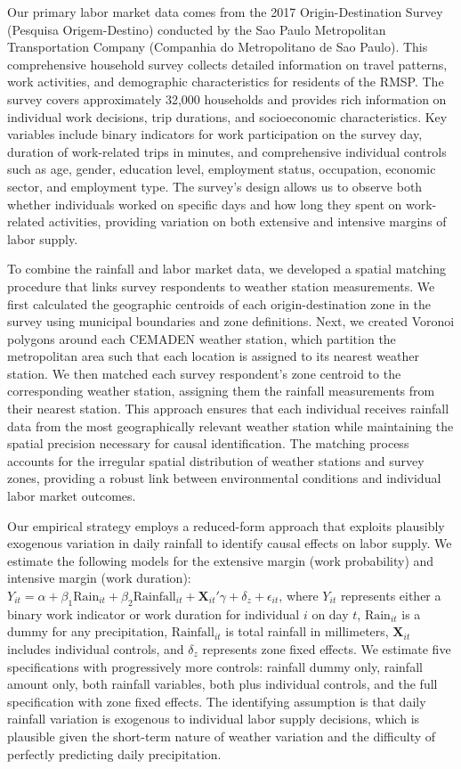 Our primary labor market data comes from the 2017 Origin-Destination Survey (Pesquisa Origem-Destino) conducted by the Sao Paulo Metropolitan Transportation Company (Companhia do Metropolitano de Sao Paulo). This comprehensive household survey collects detailed information on travel patterns, work activities, and demographic characteristics for residents of the RMSP. The survey covers approximately 32,000 households and provides rich information on individual work decisions, trip durations, and socioeconomic characteristics. Key variables include binary indicators for work participation on the survey day, duration of work-related trips in minutes, and comprehensive individual controls such as age, gender, education level, employment status, occupation, economic sector, and employment type. The survey's design allows us to observe both whether individuals worked on specific days and how long they spent on work-related activities, providing variation on both extensive and intensive margins of labor supply.

To combine the rainfall and labor market data, we developed a spatial matching procedure that links survey respondents to weather station measurements. We first calculated the geographic centroids of each origin-destination zone in the survey using municipal boundaries and zone definitions. Next, we created Voronoi polygons around each CEMADEN weather station, which partition the metropolitan area such that each location is assigned to its nearest weather station. We then matched each survey respondent's zone centroid to the corresponding weather station, assigning them the rainfall measurements from their nearest station. This approach ensures that each individual receives rainfall data from the most geographically relevant weather station while maintaining the spatial precision necessary for causal identification. The matching process accounts for the irregular spatial distribution of weather stations and survey zones, providing a robust link between environmental conditions and individual labor market outcomes.

Our empirical strategy employs a reduced-form approach that exploits plausibly exogenous variation in daily rainfall to identify causal effects on labor supply. We estimate the following models for the extensive margin (work probability) and intensive margin (work duration): $Y_{it} = \alpha + \beta_1 \text{Rain}_{it} + \beta_2 \text{Rainfall}_{it} + \mathbf{X}_{it}'\gamma + \delta_z + \epsilon_{it}$, where $Y_{it}$ represents either a binary work indicator or work duration for individual $i$ on day $t$, $\text{Rain}_{it}$ is a dummy for any precipitation, $\text{Rainfall}_{it}$ is total rainfall in millimeters, $\mathbf{X}_{it}$ includes individual controls, and $\delta_z$ represents zone fixed effects. We estimate five specifications with progressively more controls: rainfall dummy only, rainfall amount only, both rainfall variables, both plus individual controls, and the full specification with zone fixed effects. The identifying assumption is that daily rainfall variation is exogenous to individual labor supply decisions, which is plausible given the short-term nature of weather variation and the difficulty of perfectly predicting daily precipitation.

